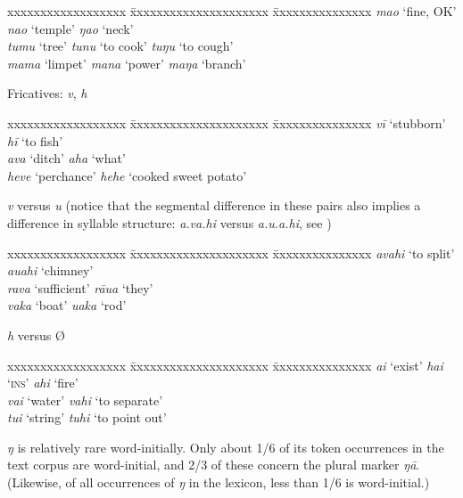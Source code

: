 \ea
\begin{tabbing}
 xxxxxxxxxxxxxxxxxx \= xxxxxxxxxxxxxxxxxxxxx \= xxxxxxxxxxxxxxx \kill
   \textit{mao} ‘fine, OK’ \>  \textit{nao} ‘temple’  \> \textit{ŋao} ‘neck’\\
  \textit{tumu} ‘tree’  \> \textit{tunu} ‘to cook’  \> \textit{tuŋu} ‘to cough’\\
 \textit{mama} ‘limpet’  \> \textit{mana} ‘power’ \>  \textit{maŋa} ‘branch’
\end{tabbing}
\z 
Fricatives: \textit{v}, \textit{h}

\ea
\begin{tabbing}
 xxxxxxxxxxxxxxxxxx \= xxxxxxxxxxxxxxxxxxxxx \= xxxxxxxxxxxxxxx \kill
  \textit{vī} ‘stubborn’  \> \textit{hī} ‘to fish’\\
  \textit{ava} ‘ditch’  \> \textit{aha} ‘what’\\
 \textit{heve} ‘perchance’ \>  \textit{hehe} ‘cooked sweet potato’
\end{tabbing}
\z 

\newpage 
\textit{v} versus \textit{u} (notice that the segmental difference in these pairs also implies a difference in syllable structure: \textit{{\ꞌ}a.va.hi} versus \textit{{\ꞌ}a.u.a.hi}, see )

\ea
\begin{tabbing}
 xxxxxxxxxxxxxxxxxx \= xxxxxxxxxxxxxxxxxxxxx \= xxxxxxxxxxxxxxx \kill
 \textit{{\ꞌ}avahi} ‘to split’  \> \textit{{\ꞌ}auahi} ‘chimney’\\
 \textit{rava} ‘sufficient’ \>  \textit{rāua} ‘they’\\
 \textit{vaka} ‘boat’ \>  \textit{{\ꞌ}uaka} ‘rod’
\end{tabbing}
\z 
{}\textit{h} versus Ø

\ea
\begin{tabbing}
 xxxxxxxxxxxxxxxxxx \= xxxxxxxxxxxxxxxxxxxxx \= xxxxxxxxxxxxxxx \kill
\textit{ai} ‘exist’  \>\textit{hai} ‘\textsc{ins}’ \> \textit{ahi} ‘fire’\\
 \textit{vai} ‘water’  \>\textit{vahi}  ‘to separate’\\
 \textit{tui} ‘string’  \>\textit{tuhi}  ‘to point out’
\end{tabbing}
\z 
\textit{ŋ} is relatively rare word-initially. Only about 1/6 of its token occurrences in the text corpus are word-initial, and 2/3 of these concern the plural marker \textit{ŋā}. (Likewise, of all occurrences of \textit{ŋ} in the lexicon, less than 1/6 is word-initial.)

